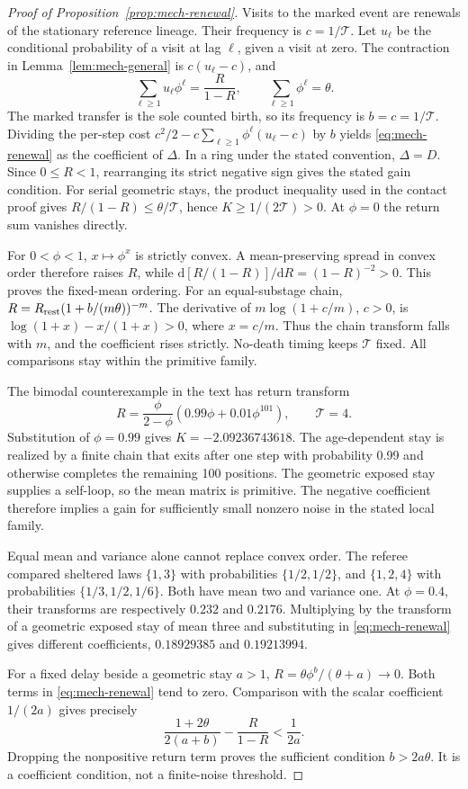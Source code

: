 \begin{proof}[Proof of Proposition~\ref{prop:mech-renewal}]
Visits to the marked event are renewals of the stationary reference lineage. Their frequency is \(c=1/\mathcal T\). Let \(u_\ell\) be the conditional probability of a visit at lag \(\ell\), given a visit at zero. The contraction in Lemma~\ref{lem:mech-general} is \(c(u_\ell-c)\), and
\[
 \sum_{\ell\geq1}u_\ell\phi^\ell=\frac R{1-R},\qquad
 \sum_{\ell\geq1}\phi^\ell=\theta.
\]
The marked transfer is the sole counted birth, so its frequency is \(b=c=1/\mathcal T\). Dividing the per-step cost \(c^2/2-c\sum_{\ell\geq1}\phi^\ell(u_\ell-c)\) by \(b\) yields \eqref{eq:mech-renewal} as the coefficient of \(\Delta\). In a ring under the stated convention, \(\Delta=D\). Since \(0\leq R<1\), rearranging its strict negative sign gives the stated gain condition. For serial geometric stays, the product inequality used in the contact proof gives \(R/(1-R)\leq\theta/\mathcal T\), hence \(K\geq1/(2\mathcal T)>0\). At \(\phi=0\) the return sum vanishes directly.

For \(0<\phi<1\), \(x\mapsto\phi^x\) is strictly convex. A mean-preserving spread in convex order therefore raises \(R\), while \(\mathrm d[R/(1-R)]/\mathrm dR=(1-R)^{-2}>0\). This proves the fixed-mean ordering. For an equal-substage chain,
\(R=R_{\rm rest}(1+b/(m\theta))^{-m}\).
The derivative of \(m\log(1+c/m)\), \(c>0\), is \(\log(1+x)-x/(1+x)>0\), where \(x=c/m\). Thus the chain transform falls with \(m\), and the coefficient rises strictly. No-death timing keeps \(\mathcal T\) fixed. All comparisons stay within the primitive family.

The bimodal counterexample in the text has return transform
\[
 R=\frac{\phi}{2-\phi}(0.99\phi+0.01\phi^{101}),\qquad \mathcal T=4.
\]
Substitution of \(\phi=0.99\) gives \(K=-2.09236743618\). The age-dependent stay is realized by a finite chain that exits after one step with probability 0.99 and otherwise completes the remaining 100 positions. The geometric exposed stay supplies a self-loop, so the mean matrix is primitive. The negative coefficient therefore implies a gain for sufficiently small nonzero noise in the stated local family.

Equal mean and variance alone cannot replace convex order. The referee compared sheltered laws \(\{1,3\}\) with probabilities \(\{1/2,1/2\}\), and \(\{1,2,4\}\) with probabilities \(\{1/3,1/2,1/6\}\). Both have mean two and variance one. At \(\phi=0.4\), their transforms are respectively \(0.232\) and \(0.2176\). Multiplying by the transform of a geometric exposed stay of mean three and substituting in \eqref{eq:mech-renewal} gives different coefficients, \(0.18929385\) and \(0.19213994\).

For a fixed delay beside a geometric stay \(a>1\), \(R=\theta\phi^b/(\theta+a)\to0\). Both terms in \eqref{eq:mech-renewal} tend to zero. Comparison with the scalar coefficient \(1/(2a)\) gives precisely
\[
 \frac{1+2\theta}{2(a+b)}-\frac R{1-R}<\frac1{2a}.
\]
Dropping the nonpositive return term proves the sufficient condition \(b>2a\theta\). It is a coefficient condition, not a finite-noise threshold.
\end{proof}

